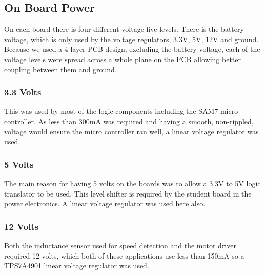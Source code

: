   \subsection{On Board Power}
  On each board there is four different voltage five levels. There is the
  battery voltage, which is only used by the voltage regulators, 3.3V, 5V, 12V
  and ground. Because we used a 4 layer PCB design, excluding the battery
  voltage, each of the voltage levels were spread across a whole plane on the
  PCB allowing better coupling between them and ground.

    \subsubsection{3.3 Volts}
    This was used by most of the logic components including the SAM7 micro
    controller. As less than 300mA was required and having a smooth, non-rippled,
    voltage would ensure the micro controller ran well, a linear voltage
    regulator was used.

    \subsubsection{5 Volts}
    The main reason for having 5 volts on the boards was to allow a 3.3V to 5V
    logic translator to be used. This level shifter is required by the student
    board in the power electronics. A linear voltage regulator was used here
    also.

    \subsubsection{12 Volts}
    Both the inductance sensor used for speed detection and the motor driver
    required 12 volts, which both of these applications use less than 150mA so a
    TPS7A4901 linear voltage regulator was used\cite{TPS7A4901}.

